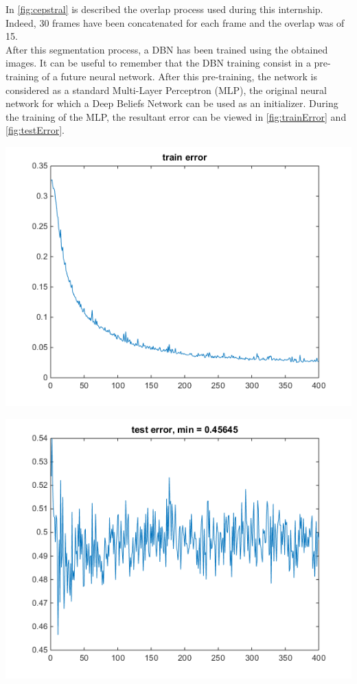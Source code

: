 \documentclass{report}
\begin{document}
	In \ref{fig:cepstral} is described the overlap process used during this internship. Indeed, 30 frames have been concatenated for each frame and the overlap was of 15.\\
	
	After this segmentation process, a DBN has been trained using the obtained images. It can be useful to remember that the DBN training consist in a pre-training of a future neural network. After this pre-training, the network is considered as a standard Multi-Layer Perceptron (MLP), the original neural network for which a Deep Beliefs Network can be used as an initializer. During the training of the MLP, the resultant error can be viewed in \ref{fig:trainError} and \ref{fig:testError}.
	
	\vspace{1cm}
	\begin{center}
		\begin{minipage}{.40\linewidth}
			\includegraphics[scale=0.42]{ressources/of1}
			\label{fig:trainError}
		\end{minipage}
		\hspace*{1.5cm}
		\begin{minipage}{.40\linewidth}
			\includegraphics[scale=0.42]{ressources/of2}

\end{minipage}
\end{center}
\end{document}
